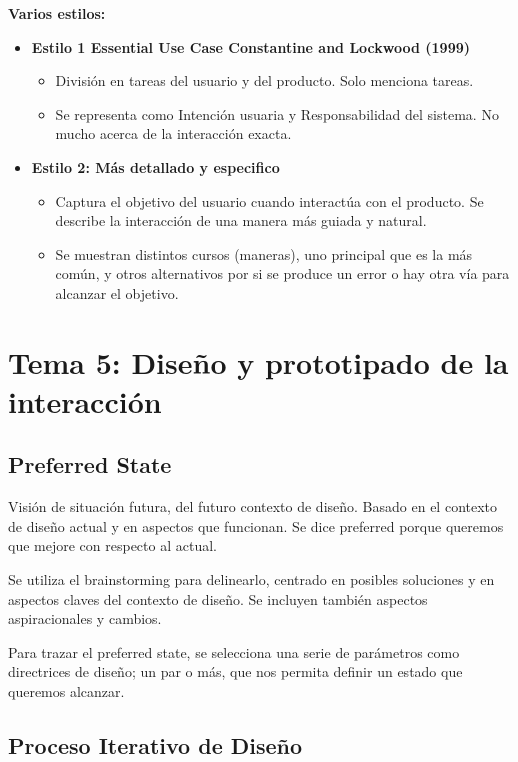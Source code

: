 \documentclass[12pt, twoside, openright]{report} %
\begin{document}
\textbf{Varios estilos:}

\begin{itemize}
	\item \textbf{Estilo 1 Essential Use Case Constantine and Lockwood (1999)}
	      \begin{itemize}
		      \item División en tareas del usuario y del producto. Solo menciona tareas.
		      \item Se representa como Intención usuaria y Responsabilidad del sistema. No mucho acerca de la interacción exacta.
	      \end{itemize}
	\item \textbf{Estilo 2: Más detallado y especifico}
	      \begin{itemize}
		      \item Captura el objetivo del usuario cuando interactúa con el producto. Se describe la interacción de una manera más guiada y natural.
		      \item Se muestran distintos cursos (maneras), uno principal que es la más común, y otros alternativos por si se produce un error o hay otra vía para alcanzar el objetivo.
	      \end{itemize}
\end{itemize}

\chapter{Tema 5: Diseño y prototipado de la interacción}

\section{Preferred State}
Visión de situación futura, del futuro contexto de diseño. Basado en el contexto de diseño actual y en aspectos que funcionan. Se dice preferred porque queremos que mejore con respecto al actual.

Se utiliza el brainstorming para delinearlo, centrado en posibles soluciones y en aspectos claves del contexto de diseño. Se incluyen también aspectos aspiracionales y cambios.

Para trazar el preferred state, se selecciona una serie de parámetros como directrices de diseño; un par o más, que nos permita definir un estado que queremos alcanzar.

\section{Proceso Iterativo de Diseño}
\end{document}
